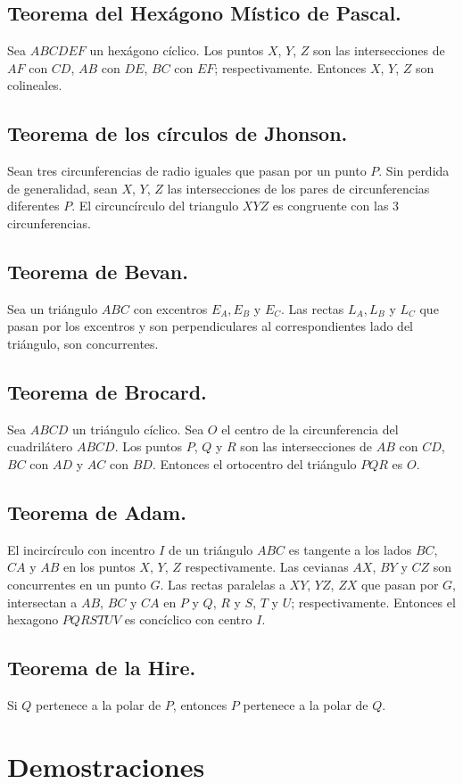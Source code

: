 \documentclass[12pt,a4paper,oneside]{book}
\begin{document}
\section{Teorema del Hexágono Místico de Pascal.}
Sea $ABCDEF$ un hexágono cíclico. Los puntos $X$, $Y$, $Z$ son las intersecciones de $AF$ con $CD$, $AB$ con $DE$, $BC$ con $EF$; respectivamente. Entonces $X$, $Y$, $Z$ son colineales.
\section{Teorema de los círculos de Jhonson.}
Sean tres circunferencias de radio iguales que pasan por un punto $P$. Sin perdida de generalidad, sean $X$, $Y$, $Z$ las intersecciones de los pares de circunferencias diferentes $P$. El circuncírculo del triangulo $XYZ$ es congruente con las 3 circunferencias.
\section{Teorema de Bevan.}
Sea un triángulo $ABC$ con excentros $E_A, E_B$ y $E_C$. Las rectas $L_A, L_B$ y $L_C$ que pasan por los excentros y son perpendiculares al correspondientes lado del triángulo, son concurrentes.
\section{Teorema de Brocard.}
Sea $ABCD$ un triángulo cíclico. Sea $O$ el centro de la circunferencia del cuadrilátero $ABCD$. Los puntos $P$, $Q$ y $R$ son las intersecciones de $AB$ con $CD$, $BC$ con $AD$ y $AC$ con $BD$. Entonces el ortocentro del triángulo $PQR$ es $O$. 
\section{Teorema de Adam.}
El incircírculo con incentro $I$ de un triángulo $ABC$ es tangente a los lados $BC$, $CA$ y $AB$ en los puntos $X$, $Y$, $Z$ respectivamente. Las cevianas  $AX$, $BY$ y $CZ$ son concurrentes en un punto $G.$ Las rectas paralelas a $XY$, $YZ$, $ZX$ que pasan por $G$, intersectan a $AB$, $BC$ y $CA$ en $P$ y $Q$, $R$ y $S$, $T$ y $U$; respectivamente. Entonces el hexagono $PQRSTUV$ es concíclico con centro $I$.
\section{Teorema de la Hire.}
Si $Q$ pertenece a la polar de $P$, entonces $P$ pertenece a la polar de $Q$.

\chapter{Demostraciones}
\end{document}
